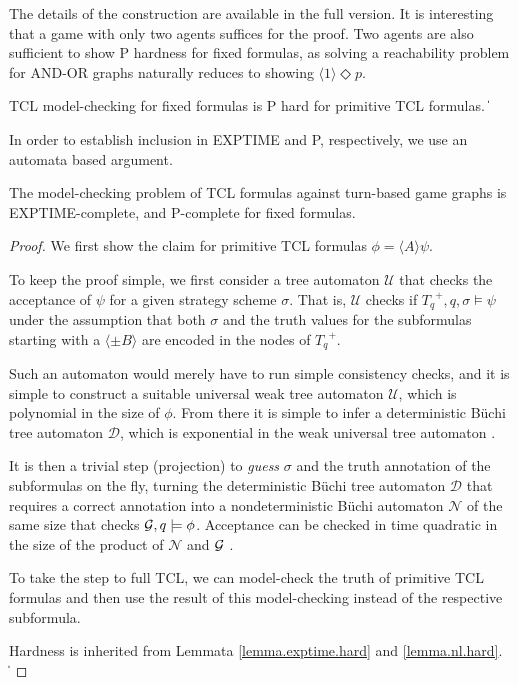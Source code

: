 \documentclass{llncs}
\newcommand{\calg}{{\cal G}}
\newcommand{\pevt}{\Diamond}
\def\qed{\ifmmode\|\else{\unskip\nobreak\hfil
\penalty50\hskip1em\null\nobreak\hfil$\blacksquare$
\parfillskip=0pt\finalhyphendemerits=0\endgraf}\fi}
\begin{document}

The details of the construction are available in the full version. 
It is interesting that a game with only two agents suffices for the proof.  
Two agents are also sufficient to show P hardness for fixed formulas, as solving a reachability problem for AND-OR graphs \cite{Immerman81} naturally reduces to showing $\langle 1 \rangle \pevt p$.

\begin{lemma}
\label{lemma.nl.hard}
TCL model-checking for fixed formulas is P hard for primitive TCL formulas.
\qed 
\end{lemma}

In order to establish inclusion in EXPTIME and P, respectively, we use an automata based argument.

\begin{theorem}
\label{theo.ms.complete}
The model-checking problem of TCL formulas against turn-based game graphs
is EXPTIME-complete, and P-complete for fixed formulas.
\end{theorem}

\begin{proof}
We first show the claim for primitive TCL formulas $\phi=\langle A \rangle \psi$.
 
To keep the proof simple, we first consider a tree automaton $\mathcal U$ that checks the acceptance of $\psi$ for a given strategy scheme $\sigma$.
That is, $\mathcal U$ checks if ${T_q}^+,q,\sigma \models \psi$ under the assumption that both $\sigma$ and the truth values for the subformulas starting with a $\langle \pm B \rangle$ are encoded in the nodes of ${T_q}^+$.

Such an automaton would merely have to run simple consistency checks, and it is simple to construct a suitable universal weak tree automaton $\mathcal U$, which is polynomial in the size of $\phi$.
From there it is simple to infer a deterministic B\"uchi tree automaton 
$\mathcal D$, which is exponential in the weak universal tree automaton 
\cite{Muller+Schupp/95/Alternating}.

It is then a trivial step (projection) to \emph{guess} $\sigma$ and the truth annotation of the subformulas on the fly, turning the deterministic B\"uchi tree automaton $\mathcal D$ that requires a correct annotation into a nondeterministic B\"uchi automaton $\mathcal N$ of the same size that checks $\calg,q \models \phi$.
%
Acceptance can be checked in time quadratic in the size of the product of $\mathcal N$ and $\calg$ \cite{Chatterjee+Henzinger/12/Buchi}.

To take the step to full TCL, we can model-check the truth of primitive TCL formulas and then use the result of this model-checking instead of the respective subformula.

Hardness is inherited from Lemmata \ref{lemma.exptime.hard} and \ref{lemma.nl.hard}.
\qed
\end{proof}
\end{document}
